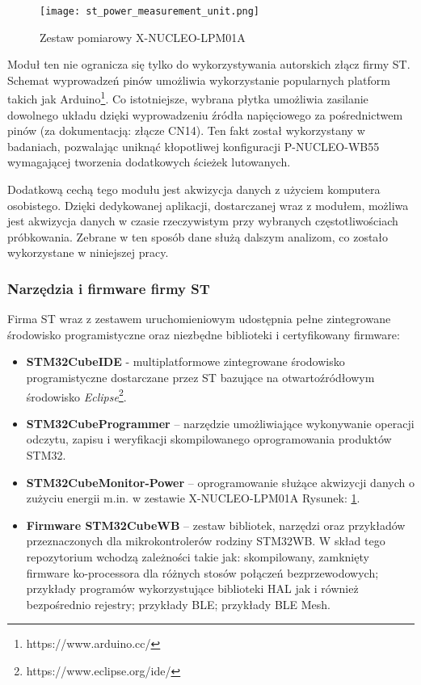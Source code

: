 \begin{figure}[!ht]
	\centering \texttt{[image: st\_power\_measurement\_unit.png]}
	\caption{Zestaw pomiarowy X-NUCLEO-LPM01A}
	\label{rys:nucleo_lpm01a}
\end{figure}

Moduł ten nie ogranicza się tylko do wykorzystywania autorskich złącz firmy ST. Schemat wyprowadzeń pinów
umożliwia wykorzystanie popularnych platform takich jak Arduino\footnote{https://www.arduino.cc/}. Co istotniejsze, wybrana płytka umożliwia
zasilanie dowolnego układu dzięki wyprowadzeniu źródła napięciowego za pośrednictwem pinów 
(za dokumentacją: złącze CN14). Ten fakt został wykorzystany w badaniach, pozwalając uniknąć kłopotliwej
konfiguracji P-NUCLEO-WB55 wymagającej tworzenia dodatkowych ścieżek lutowanych.

Dodatkową cechą tego modułu jest akwizycja danych z użyciem komputera osobistego. Dzięki dedykowanej
aplikacji, dostarczanej wraz z modułem, możliwa jest akwizycja danych w czasie rzeczywistym przy
wybranych częstotliwościach próbkowania. Zebrane w ten sposób dane służą dalszym analizom, co zostało
wykorzystane w niniejszej pracy. 

\subsubsection{Narzędzia i firmware firmy ST}
Firma ST wraz z zestawem uruchomieniowym udostępnia pełne zintegrowane środowisko
programistyczne oraz niezbędne biblioteki i certyfikowany firmware:

\begin{itemize}
\item \textbf{STM32CubeIDE} \cite{noauthor_stm32cubeide_2022} - multiplatformowe zintegrowane środowisko programistyczne
dostarczane przez ST bazujące na otwartoźródłowym środowisko \textit{Eclipse}\footnote{https://www.eclipse.org/ide/}.
\item \textbf{STM32CubeProgrammer} \cite{noauthor_stm32cubeprog_2022} -- narzędzie umożliwiające wykonywanie operacji
odczytu, zapisu i weryfikacji skompilowanego oprogramowania produktów STM32. 
\item \textbf{STM32CubeMonitor-Power} \cite{noauthor_stm32cubemonpwr_2022} -- oprogramowanie służące akwizycji danych
o zużyciu energii m.in. w zestawie X-NUCLEO-LPM01A Rysunek: \ref{rys:nucleo_lpm01a}.
\item \textbf{Firmware STM32CubeWB} \cite{noauthor_stm32cubewb_2022} -- zestaw bibliotek, narzędzi oraz przykładów
przeznaczonych dla mikrokontrolerów rodziny STM32WB. W skład tego repozytorium wchodzą zależności takie jak:
skompilowany, zamknięty firmware ko-processora dla różnych stosów połączeń bezprzewodowych; przykłady programów
wykorzystujące biblioteki HAL jak i również bezpośrednio rejestry; przykłady BLE; przykłady BLE Mesh.
\end{itemize}


